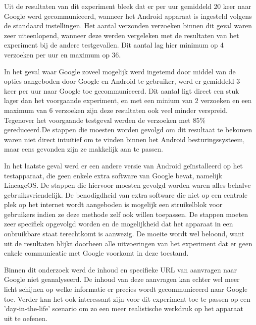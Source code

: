 Uit de resultaten van dit experiment bleek dat er per uur gemiddeld 20 keer naar Google werd gecommuniceerd, wanneer het Android apparaat is ingesteld volgens de standaard instellingen. Het aantal verzonden verzoeken binnen dit geval waren zeer uiteenlopend, wanneer deze werden vergeleken met de resultaten van het experiment bij de andere testgevallen. Dit aantal lag hier minimum op 4 verzoeken per uur en maximum op 36.

In het geval waar Google zoveel mogelijk werd ingetemd door middel van de opties aangeboden door Google en Android te gebruiker, werd er gemiddeld 3 keer per uur naar Google toe gecommuniceerd. Dit aantal ligt direct een stuk lager dan het voorgaande experiment, en met een minium van 2 verzoeken en een maximum van 6 verzoeken zijn deze resultaten ook veel minder verspreid. Tegenover het voorgaande testgeval werden de verzoeken met 85\% gereduceerd.De stappen die moesten worden gevolgd om dit resultaat te bekomen waren niet direct intuïtief om te vinden binnen het Android besturingssysteem, maar eens gevonden zijn ze makkelijk aan te passen.

In het laatste geval werd er een andere versie van Android geïnstalleerd op het testapparaat, die geen enkele extra software van Google bevat, namelijk LineageOS. De stappen die hiervoor moesten gevolgd worden waren alles behalve gebruiksvriendelijk. De benodigdheid van extra software die niet op een centrale plek op het internet wordt aangeboden is mogelijk een struikelblok voor gebruikers indien ze deze methode zelf ook willen toepassen. De stappen moeten zeer specifiek opgevolgd worden en de mogelijkheid dat het apparaat in een onbruikbare staat terechtkomt is aanwezig. De moeite wordt wel beloond, want uit de resultaten blijkt doorheen alle uitvoeringen van het experiment dat er geen enkele communicatie met Google voorkomt in deze toestand.

Binnen dit onderzoek werd de inhoud en specifieke URL van aanvragen naar Google niet geanalyseerd. De inhoud van deze aanvragen kan echter wel meer licht schijnen op welke informatie er precies wordt gecommuniceerd naar Google toe. Verder kan het ook interessant zijn voor dit experiment toe te passen op een 'day-in-the-life' scenario om zo een meer realistische werkdruk op het apparaat uit te oefenen.
